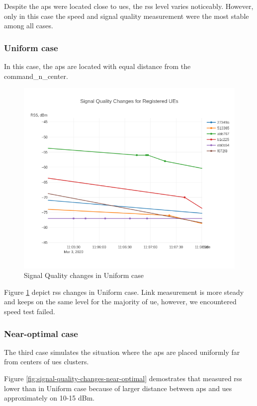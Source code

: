 Despite the \glspl{ap} were located close to \glspl{ue}, the \acrshort{rss} level varies noticeably. However, only in this case the speed and signal quality measurement were the most stable among all cases.

\subsubsection{Uniform case}

In this case, the \glspl{ap} are located with equal distance from the \gls{command_n_center}.

\begin{figure}[H]
	\centering
	\includegraphics[width=0.7\linewidth,keepaspectratio]{images/Exp4_Uniform.png}
	\caption{Signal Quality changes in Uniform case}
	\label{fig:signal-quality-changes-uniform-optimal}
\end{figure}

Figure \ref{fig:signal-quality-changes-uniform-optimal} depict \acrshort{rss} changes in Uniform case. Link measurement is more steady and keeps on the same level for the majority of \gls{ue}, however, we encountered speed test failed.

\subsubsection{Near-optimal case}

The third case simulates the situation where the \glspl{ap} are placed
uniformly far from centers of \glspl{ue} clusters.

Figure \ref{fig:signal-quality-changes-near-optimal} demostrates that measured \acrshort{rss} lower than in Uniform case because of larger distance between \glspl{ap} and \glspl{ue} approximately on 10-15 dBm.

